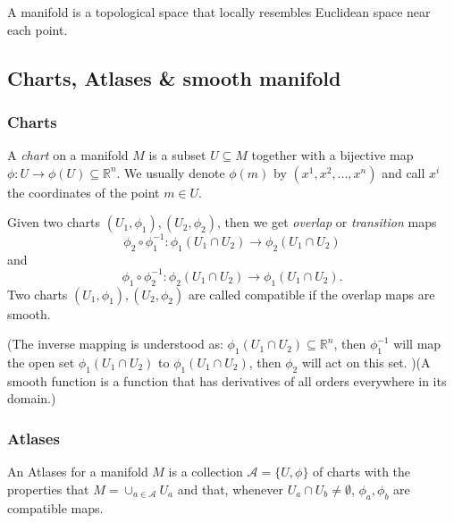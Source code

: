 \begin{refsection}
\begin{remark}
A manifold is a topological space that locally resembles Euclidean space near each point.
\end{remark}


\subsection{Charts, Atlases \& smooth manifold}
\subsubsection{Charts}
\begin{definition}[chart]
A \emph{chart} on a manifold $M$ is a subset $U\subseteq M$ together with a bijective map $\phi:U\rightarrow \phi(U)\subseteq \mathbb{R}^n$. We usually denote $\phi(m)$ by $(x^1,x^2,...,x^n)$ and call $x^i$ the coordinates of the point $m \in U$. 	
\end{definition}

\begin{definition}
Given two charts $(U_1,\phi_1),(U_2,\phi_2)$, then we get \emph{overlap} or \emph{transition} maps
$$\phi_2 \circ \phi_1^{-1}:\phi_1(U_1\cap U_2) \rightarrow \phi_2(U_1\cap U_2)$$ and 
$$\phi_1 \circ \phi_2^{-1}:\phi_2(U_1\cap U_2) \rightarrow \phi_1(U_1\cap U_2).$$	
Two charts $(U_1,\phi_1),(U_2,\phi_2)$ are called compatible if the overlap maps are smooth.
\end{definition}

\begin{remark}
(The inverse mapping is understood as: $\phi_1(U_1 \cap U_2) \subseteq \mathbb{R}^n$, then $\phi_1^{-1}$ will map the open set $\phi_1(U_1 \cap U_2)$ to $\phi_1(U_1 \cap U_2)$, then $\phi_2$ will act on this set. )(A smooth function is a function that has derivatives of all orders everywhere in its domain.) 	
\end{remark}


\subsubsection{Atlases}
\begin{definition}[Alases]
An Atlases for a manifold $M$ is a collection $\mathcal{A}=\{U,\phi \}$ of charts with the properties that $M = \cup_{a\in \mathcal{A}} U_a$ and that, whenever $U_a \cap U_b \neq \emptyset$, $\phi_a,\phi_b$ are compatible maps.	
\end{definition}



\end{refsection}
